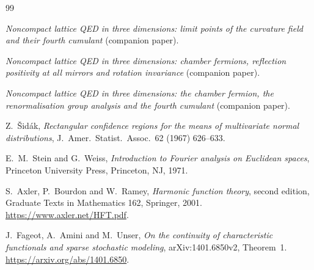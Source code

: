 \documentclass[11pt]{amsart}
\theoremstyle{definition}
\begin{document}
\begin{thebibliography}{99}

\emph{Noncompact lattice QED in three dimensions: limit points of the curvature field
and their fourth cumulant} (companion paper).

\emph{Noncompact lattice QED in three dimensions: chamber fermions,
reflection positivity at all mirrors and rotation invariance} (companion paper).

\emph{Noncompact lattice QED in three dimensions: the chamber fermion,
the renormalisation group analysis and the fourth cumulant} (companion paper).

Z.~\v{S}id\'ak, \emph{Rectangular confidence regions for the means of multivariate normal distributions}, J.\ Amer.\ Statist.\ Assoc.\ 62 (1967) 626--633.

E.~M.~Stein and G.~Weiss, \emph{Introduction to Fourier analysis on Euclidean spaces},
Princeton University Press, Princeton, NJ, 1971.

S.~Axler, P.~Bourdon and W.~Ramey, \emph{Harmonic function theory},
second edition, Graduate Texts in Mathematics 162, Springer, 2001.
\url{https://www.axler.net/HFT.pdf}.


J.~Fageot, A.~Amini and M.~Unser,
\emph{On the continuity of characteristic functionals and sparse stochastic modeling},
arXiv:1401.6850v2, Theorem~1.
\url{https://arxiv.org/abs/1401.6850}.

\end{thebibliography}
\end{document}
